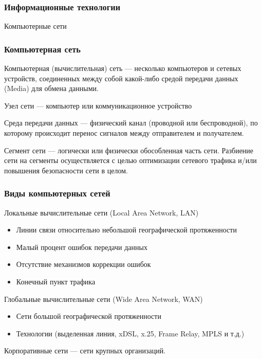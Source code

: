 \subtitle{Лекция 7 --- Информационные технологии}

\frame[plain]
{\titlepage}	%


\begin{frame}
\frametitle{Информационные технологии}

\begin{center}

\Huge
Компьютерные сети
	
\end{center}


\end{frame}

\begin{frame}
\frametitle{Компьютерная сеть}

Компьютерная (вычислительная) сеть --- несколько компьютеров и сетевых устройств, соединенных между собой какой-либо средой передачи данных (Media) для обмена данными.

Узел сети --- компьютер или коммуникационное устройство

Среда передачи данных --- физический канал (проводной или беспроводной), по которому происходит перенос сигналов между отправителем и получателем.

Сегмент сети --- логически или физически обособленная часть сети.
Разбиение сети на сегменты осуществляется с целью оптимизации сетевого трафика и/или повышения безопасности сети в целом. 

\end{frame}

\begin{frame}[t]
\frametitle{Виды компьютерных сетей}

Локальные вычислительные сети (Local Area Network, LAN) 
\begin{itemize}
	\item Линии связи относительно небольшой географической протяженности
	\item Малый процент ошибок передачи данных
	\item Отсутствие механизмов коррекции ошибок
	\item Конечный пункт трафика
\end{itemize}

Глобальные вычислительные сети (Wide Area Network, WAN) 
\begin{itemize}
	\item Сети большой географической протяженности
  \item Технологии (выделенная линия, xDSL, x.25, Frame Relay, MPLS и т.д.)
\end{itemize}

Корпоративные сети --- сети крупных организаций. 

\end{frame}

